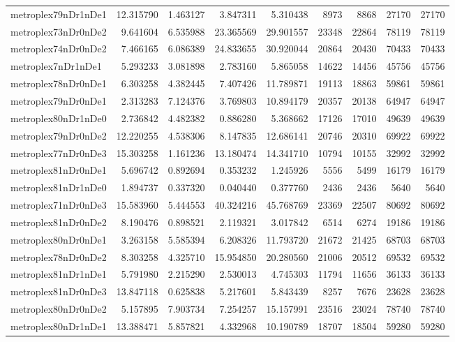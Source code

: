 \begin{longtable}{|l|r|r|r|r|r|r|r|r|}
metroplex79nDr1nDe1 & 12.315790 & 1.463127 & 3.847311 & 5.310438 & 8973 & 8868 & 27170 & 27170 \\
metroplex73nDr0nDe2 & 9.641604 & 6.535988 & 23.365569 & 29.901557 & 23348 & 22864 & 78119 & 78119 \\
metroplex74nDr0nDe2 & 7.466165 & 6.086389 & 24.833655 & 30.920044 & 20864 & 20430 & 70433 & 70433 \\
metroplex7nDr1nDe1 & 5.293233 & 3.081898 & 2.783160 & 5.865058 & 14622 & 14456 & 45756 & 45756 \\
metroplex78nDr0nDe1 & 6.303258 & 4.382445 & 7.407426 & 11.789871 & 19113 & 18863 & 59861 & 59861 \\
metroplex79nDr0nDe1 & 2.313283 & 7.124376 & 3.769803 & 10.894179 & 20357 & 20138 & 64947 & 64947 \\
metroplex80nDr1nDe0 & 2.736842 & 4.482382 & 0.886280 & 5.368662 & 17126 & 17010 & 49639 & 49639 \\
metroplex79nDr0nDe2 & 12.220255 & 4.538306 & 8.147835 & 12.686141 & 20746 & 20310 & 69922 & 69922 \\
metroplex77nDr0nDe3 & 15.303258 & 1.161236 & 13.180474 & 14.341710 & 10794 & 10155 & 32992 & 32992 \\
metroplex81nDr0nDe1 & 5.696742 & 0.892694 & 0.353232 & 1.245926 & 5556 & 5499 & 16179 & 16179 \\
metroplex81nDr1nDe0 & 1.894737 & 0.337320 & 0.040440 & 0.377760 & 2436 & 2436 & 5640 & 5640 \\
metroplex71nDr0nDe3 & 15.583960 & 5.444553 & 40.324216 & 45.768769 & 23369 & 22507 & 80692 & 80692 \\
metroplex81nDr0nDe2 & 8.190476 & 0.898521 & 2.119321 & 3.017842 & 6514 & 6274 & 19186 & 19186 \\
metroplex80nDr0nDe1 & 3.263158 & 5.585394 & 6.208326 & 11.793720 & 21672 & 21425 & 68703 & 68703 \\
metroplex78nDr0nDe2 & 8.303258 & 4.325710 & 15.954850 & 20.280560 & 21006 & 20512 & 69532 & 69532 \\
metroplex81nDr1nDe1 & 5.791980 & 2.215290 & 2.530013 & 4.745303 & 11794 & 11656 & 36133 & 36133 \\
metroplex81nDr0nDe3 & 13.847118 & 0.625838 & 5.217601 & 5.843439 & 8257 & 7676 & 23628 & 23628 \\
metroplex80nDr0nDe2 & 5.157895 & 7.903734 & 7.254257 & 15.157991 & 23516 & 23024 & 78740 & 78740 \\
metroplex80nDr1nDe1 & 13.388471 & 5.857821 & 4.332968 & 10.190789 & 18707 & 18504 & 59280 & 59280 \\

\end{longtable}
